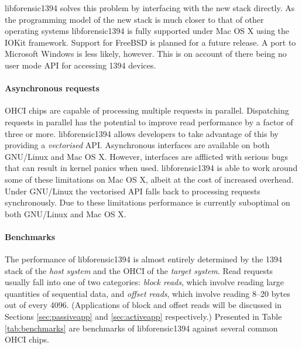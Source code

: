 \documentclass[numbers=noenddot,      %
               abstract,              %
               captions=tableheading, %
               DIV=8]                 %
              {scrartcl}
\begin{document}
libforensic1394 solves this problem by interfacing with the new stack
directly. As the programming model of the new stack is much closer to
that of other operating systems libforensic1394 is fully supported under
Mac OS X using the IOKit framework. Support for FreeBSD is planned for a
future release. A port to Microsoft Windows is less likely,
however. This is on account of there being no user mode API for
accessing 1394 devices.

\paragraph{Asynchronous requests}
OHCI chips are capable of processing multiple requests in
parallel. Dispatching requests in parallel has the potential to improve
read performance by a factor of three or more. libforensic1394 allows
developers to take advantage of this by providing a \emph{vectorised}
API. Asynchronous interfaces are available on both GNU/Linux and Mac OS
X. However, interfaces are afflicted with serious bugs that can result
in kernel panics when used. libforensic1394 is able to work around some
of these limitations on Mac OS X, albeit at the cost of increased
overhead. Under GNU/Linux the vectorised API falls back to processing
requests synchronously. Due to these limitations performance is
currently suboptimal on both GNU/Linux and Mac OS X.

\paragraph{Benchmarks}
The performance of libforensic1394 is almost entirely determined by the
1394 stack of the \emph{host system} and the OHCI of the \emph{target
  system}. Read requests usually fall into one of two categories:
\emph{block reads}, which involve reading large quantities of sequential
data, and \emph{offset reads}, which involve reading 8--20 bytes out of
every 4096. (Applications of block and offset reads will be discussed in
Sections \ref{sec:passiveapp} and \ref{sec:activeapp} respectively.)
Presented in Table \ref{tab:benchmarks} are benchmarks of
libforensic1394 against several common OHCI chips.
\end{document}
